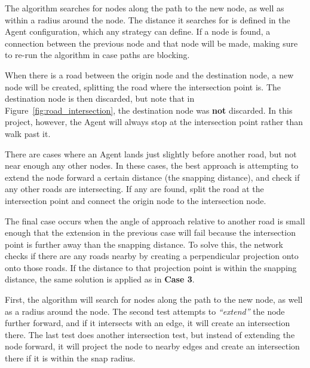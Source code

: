\begin{CaseEnum}
  \item The algorithm searches for nodes along the path to the new node, as well as within a radius around the node.
  The distance it searches for is defined in the Agent configuration, which any strategy can define.
  If a node is found, a connection between the previous node and that node will be made, making sure to re-run the algorithm in case paths are blocking.

  \item When there is a road between the origin node and the destination node, a new node will be created, splitting the road where the intersection point is.
  The destination node is then discarded, but note that in Figure~\ref{fig:road_intersection}, the destination node was \textbf{not} discarded.
  In this project, however, the Agent will always stop at the intersection point rather than walk past it.

  \item There are cases where an Agent lands just slightly before another road, but not near enough any other nodes.
  In these cases, the best approach is attempting to extend the node forward a certain distance (the snapping distance), and check if any other roads are intersecting.
  If any are found, split the road at the intersection point and connect the origin node to the intersection node.

  \item The final case occurs when the angle of approach relative to another road is small enough that the extension in the previous case will fail because the intersection point is further away than the snapping distance.
  To solve this, the network checks if there are any roads nearby by creating a perpendicular projection onto onto those roads.
  If the distance to that projection point is within the snapping distance, the same solution is applied as in \textbf{Case 3}.
\end{CaseEnum}

First, the algorithm will search for nodes along the path to the new node, as well as a radius around the node.
The second test attempts to \textit{``extend''} the node further forward, and if it intersects with an edge, it will create an intersection there.
The last test does another intersection test, but instead of extending the node forward, it will project the node to nearby edges and create an intersection there if it is within the snap radius.


